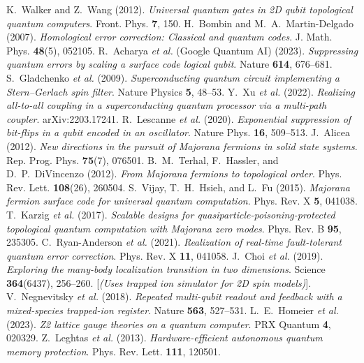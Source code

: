 \documentclass[11pt]{article}
\begin{document}
\begin{thebibliography}{99}
 K.~Walker and Z.~Wang (2012). \textit{Universal quantum gates in 2D qubit topological quantum computers}. Front. Phys. \textbf{7}, 150.
 H.~Bombin and M.~A.~Martin-Delgado (2007). \textit{Homological error correction: Classical and quantum codes}. J. Math. Phys. \textbf{48}(5), 052105.
 R.~Acharya \textit{et al.} (Google Quantum AI) (2023). \textit{Suppressing quantum errors by scaling a surface code logical qubit}. Nature \textbf{614}, 676–681.
 S.~Gladchenko \textit{et al.} (2009). \textit{Superconducting quantum circuit implementing a Stern–Gerlach spin filter}. Nature Physics \textbf{5}, 48–53.
 Y.~Xu \textit{et al.} (2022). \textit{Realizing all-to-all coupling in a superconducting quantum processor via a multi-path coupler}. arXiv:2203.17241.
 R.~Lescanne \textit{et al.} (2020). \textit{Exponential suppression of bit-flips in a qubit encoded in an oscillator}. Nature Phys. \textbf{16}, 509–513.
 J.~Alicea (2012). \textit{New directions in the pursuit of Majorana fermions in solid state systems}. Rep. Prog. Phys. \textbf{75}(7), 076501.
 B.~M.~Terhal, F.~Hassler, and D.~P.~DiVincenzo (2012). \textit{From Majorana fermions to topological order}. Phys. Rev. Lett. \textbf{108}(26), 260504.
 S.~Vijay, T.~H.~Hsieh, and L.~Fu (2015). \textit{Majorana fermion surface code for universal quantum computation}. Phys. Rev. X \textbf{5}, 041038.
 T.~Karzig \textit{et al.} (2017). \textit{Scalable designs for quasiparticle-poisoning-protected topological quantum computation with Majorana zero modes}. Phys. Rev. B \textbf{95}, 235305.
 C.~Ryan-Anderson \textit{et al.} (2021). \textit{Realization of real-time fault-tolerant quantum error correction}. Phys. Rev. X \textbf{11}, 041058.
 J.~Choi \textit{et al.} (2019). \textit{Exploring the many-body localization transition in two dimensions}. Science \textbf{364}(6437), 256–260. [\textit{(Uses trapped ion simulator for 2D spin models)}].
 V.~Negnevitsky \textit{et al.} (2018). \textit{Repeated multi-qubit readout and feedback with a mixed-species trapped-ion register}. Nature \textbf{563}, 527–531.
 L.~E.~Homeier \textit{et al.} (2023). \textit{Z2 lattice gauge theories on a quantum computer}. PRX Quantum \textbf{4}, 020329.
 Z.~Leghtas \textit{et al.} (2013). \textit{Hardware-efficient autonomous quantum memory protection}. Phys. Rev. Lett. \textbf{111}, 120501.

\end{thebibliography}
\end{document}
